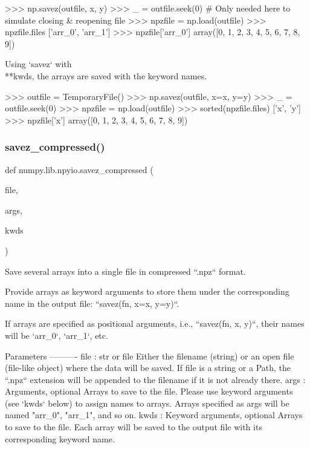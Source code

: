 \begin{DoxyVerb}
\begin{DoxyVerb}
>>> np.savez(outfile, x, y)
>>> _ = outfile.seek(0) # Only needed here to simulate closing & reopening file
>>> npzfile = np.load(outfile)
>>> npzfile.files
['arr_0', 'arr_1']
>>> npzfile['arr_0']
array([0, 1, 2, 3, 4, 5, 6, 7, 8, 9])

Using `savez` with \\**kwds, the arrays are saved with the keyword names.

>>> outfile = TemporaryFile()
>>> np.savez(outfile, x=x, y=y)
>>> _ = outfile.seek(0)
>>> npzfile = np.load(outfile)
>>> sorted(npzfile.files)
['x', 'y']
>>> npzfile['x']
array([0, 1, 2, 3, 4, 5, 6, 7, 8, 9])\end{DoxyVerb}
 \mbox{\label{namespacenumpy_1_1lib_1_1npyio_ae02da905d175547e61d68ee4bacb8600}} 
\subsubsection{\texorpdfstring{savez\+\_\+compressed()}{savez\_compressed()}}
{\footnotesize\ttfamily def numpy.\+lib.\+npyio.\+savez\+\_\+compressed (\begin{DoxyParamCaption}\item[{}]{file,  }\item[{}]{args,  }\item[{}]{kwds }\end{DoxyParamCaption})}

\begin{DoxyVerb}Save several arrays into a single file in compressed ``.npz`` format.

Provide arrays as keyword arguments to store them under the
corresponding name in the output file: ``savez(fn, x=x, y=y)``.

If arrays are specified as positional arguments, i.e., ``savez(fn,
x, y)``, their names will be `arr_0`, `arr_1`, etc.

Parameters
----------
file : str or file
    Either the filename (string) or an open file (file-like object)
    where the data will be saved. If file is a string or a Path, the
    ``.npz`` extension will be appended to the filename if it is not
    already there.
args : Arguments, optional
    Arrays to save to the file. Please use keyword arguments (see
    `kwds` below) to assign names to arrays.  Arrays specified as
    args will be named "arr_0", "arr_1", and so on.
kwds : Keyword arguments, optional
    Arrays to save to the file. Each array will be saved to the
    output file with its corresponding keyword name.


\end{DoxyVerb}
\end{DoxyVerb}
